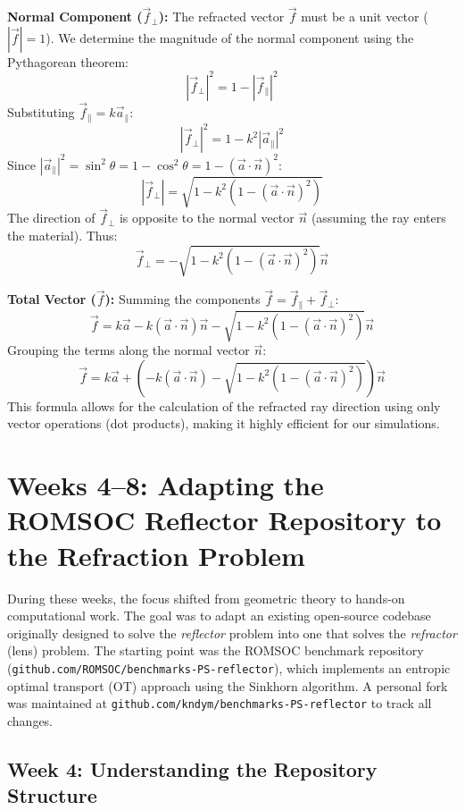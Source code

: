 \documentclass{article}
\begin{document}
\textbf{Normal Component ($\vec{f}_{\perp}$):}
The refracted vector $\vec{f}$ must be a unit vector ($|\vec{f}| = 1$). We determine the magnitude of the normal component using the Pythagorean theorem:
\[ |\vec{f}_{\perp}|^2 = 1 - |\vec{f}_{\parallel}|^2 \]
Substituting $\vec{f}_{\parallel} = k \vec{a}_{\parallel}$:
\[ |\vec{f}_{\perp}|^2 = 1 - k^2 |\vec{a}_{\parallel}|^2 \]
Since $|\vec{a}_{\parallel}|^2 = \sin^2 \theta = 1 - \cos^2 \theta = 1 - (\vec{a} \cdot \vec{n})^2$:
\[ |\vec{f}_{\perp}| = \sqrt{1 - k^2 (1 - (\vec{a} \cdot \vec{n})^2)} \]
The direction of $\vec{f}_{\perp}$ is opposite to the normal vector $\vec{n}$ (assuming the ray enters the material). Thus:
\begin{equation}
    \vec{f}_{\perp} = - \sqrt{1 - k^2 (1 - (\vec{a} \cdot \vec{n})^2)} \vec{n}
\end{equation}

\textbf{Total Vector ($\vec{f}$):}
Summing the components $\vec{f} = \vec{f}_{\parallel} + \vec{f}_{\perp}$:
\[ \vec{f} = k \vec{a} - k(\vec{a} \cdot \vec{n})\vec{n} - \sqrt{1 - k^2 (1 - (\vec{a} \cdot \vec{n})^2)} \vec{n} \]
Grouping the terms along the normal vector $\vec{n}$:
\begin{equation}
    \vec{f} = k\vec{a} + \left( -k(\vec{a} \cdot \vec{n}) - \sqrt{1 - k^2(1 - (\vec{a} \cdot \vec{n})^2)} \right)\vec{n}
\end{equation}
This formula allows for the calculation of the refracted ray direction using only vector operations (dot products), making it highly efficient for our simulations.

\section{Weeks 4--8: Adapting the ROMSOC Reflector Repository to the Refraction Problem}

During these weeks, the focus shifted from geometric theory to hands-on computational work.
The goal was to adapt an existing open-source codebase originally designed to solve the
\emph{reflector} problem into one that solves the \emph{refractor} (lens) problem. The
starting point was the ROMSOC benchmark repository
(\texttt{github.com/ROMSOC/benchmarks-PS-reflector}), which implements an entropic
optimal transport (OT) approach using the Sinkhorn algorithm. A personal fork was
maintained at \texttt{github.com/kndym/benchmarks-PS-reflector} to track all changes.

\subsection{Week 4: Understanding the Repository Structure}
\end{document}
